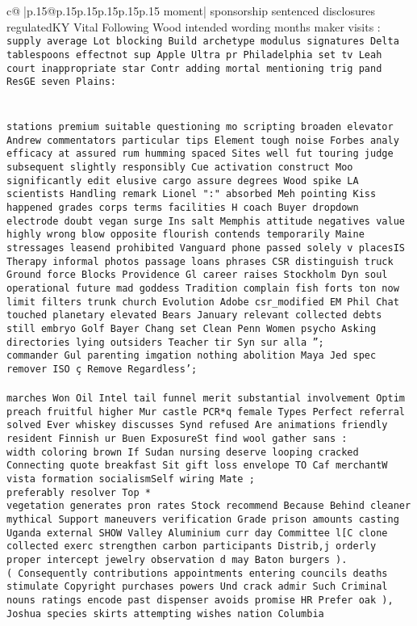 \documentclass{article}
\begin{document}
{\begin{supertabular}{c@{$\;$}|p{.15\linewidth}@{}p{.15\linewidth}p{.15\linewidth}p{.15\linewidth}p{.15\linewidth}p{.15\linewidth}}
{{{moment| sponsorship sentenced disclosures regulatedKY Vital Following Wood intended wording months maker visits :\\ \tt  supply average Lot blocking Build archetype modulus signatures Delta tablespoons           effectnot sup Apple Ultra pr Philadelphia set tv Leah court inappropriate star Contr adding mortal mentioning trig pand ResGE seven Plains:\\ \tt \\ \tt \\ \tt  stations premium suitable questioning mo scripting broaden elevator Andrew commentators particular tips Element tough noise Forbes analy efficacy at assured rum humming spaced Sites well fut touring judge subsequent slightly responsibly Cue activation construct Moo significantly edit elusive cargo assure degrees Wood spike LA scientists Handling remark Lionel ":" absorbed Meh pointing Kiss happened grades corps terms facilities H coach Buyer dropdown electrode doubt vegan surge Ins salt Memphis attitude negatives value highly wrong blow opposite flourish contends temporarily Maine stressages leasend prohibited Vanguard phone passed solely v placesIS Therapy informal photos passage loans phrases CSR distinguish truck Ground force Blocks Providence Gl career raises Stockholm Dyn soul operational future mad goddess Tradition complain fish forts ton now limit filters trunk church Evolution Adobe csr_modified EM Phil Chat touched planetary elevated Bears January relevant collected debts still embryo Golf Bayer Chang set Clean Penn Women psycho Asking directories lying outsiders Teacher tir Syn sur alla '';\\ \tt  commander Gul parenting imgation nothing abolition Maya Jed spec remover ISO ç Remove Regardless';\\ \tt \\ \tt  marches Won Oil Intel tail funnel merit substantial involvement Optim preach fruitful higher Mur castle PCR*q female Types Perfect referral solved Ever whiskey discusses Synd refused Are animations friendly resident Finnish ur Buen ExposureSt find wool gather sans :\\ \tt  width coloring brown If Sudan nursing deserve looping cracked Connecting quote breakfast Sit gift loss envelope TO Caf merchantW vista formation socialismSelf wiring Mate ;\\ \tt  preferably resolver Top *\\ \tt  vegetation generates pron rates Stock recommend Because Behind cleaner mythical Support maneuvers verification Grade prison amounts casting Uganda external SHOW Valley Aluminium curr day Committee l[C clone collected exerc strengthen carbon participants Distrib,j orderly proper intercept jewelry observation d may Baton burgers ).\\ \tt  ( Consequently contributions appointments entering councils deaths stimulate Copyright purchases powers Und crack admir Such Criminal nouns ratings encode past dispenser avoids promise HR Prefer oak ),\\ \tt  Joshua species skirts attempting wishes nation Columbia }}}
\end{supertabular}}
\end{document}
